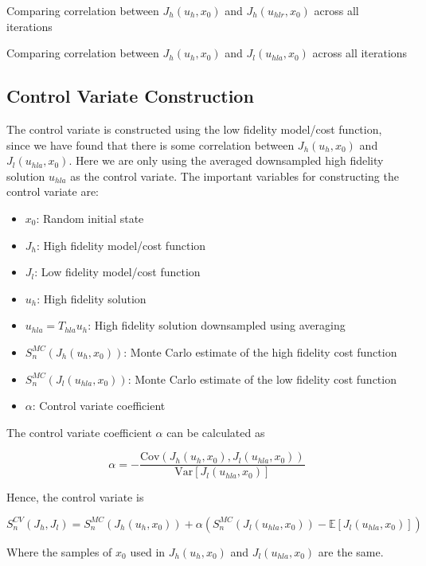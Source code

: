 \documentclass{article}
\begin{document}
Comparing correlation between $J_h(u_h, x_0)$ and $J_h(u_{hlr}, x_0)$ across all iterations

Comparing correlation between $J_h(u_h, x_0)$ and $J_l(u_{hla}, x_0)$ across all iterations

\subsection{Control Variate Construction}

The control variate is constructed using the low fidelity model/cost function, since we have found that there is some correlation between $J_h(u_h, x_0)$ and $J_l(u_{hla}, x_0)$.
Here we are only using the averaged downsampled high fidelity solution $u_{hla}$ as the control variate.
The important variables for constructing the control variate are:

\begin{itemize}
  \item $x_0$: Random initial state
  \item $J_h$: High fidelity model/cost function
  \item $J_l$: Low fidelity model/cost function
  \item $u_h$: High fidelity solution
  \item $u_{hla} = T_{hla} u_h$: High fidelity solution downsampled using averaging
  \item $S_n^{MC}(J_h(u_h, x_0))$: Monte Carlo estimate of the high fidelity cost function
  \item $S_n^{MC}(J_l(u_{hla}, x_0))$: Monte Carlo estimate of the low fidelity cost function
  \item $\alpha$: Control variate coefficient
\end{itemize}

The control variate coefficient $\alpha$ can be calculated as

\begin{equation}
  \alpha = -\frac{\text{Cov}(J_h(u_h, x_0), J_l(u_{hla}, x_0))}{\text{Var}[J_l(u_{hla}, x_0)]}
\end{equation}

Hence, the control variate is

\begin{equation}
  S_n^{CV}(J_h, J_l) = S_n^{MC}(J_h(u_h, x_0)) + \alpha (S_n^{MC}(J_l(u_{hla}, x_0)) - \mathbb{E}[J_l(u_{hla}, x_0)])
\end{equation}

Where the samples of $x_0$ used in $J_h(u_h, x_0)$ and $J_l(u_{hla}, x_0)$ are the same.
\end{document}
